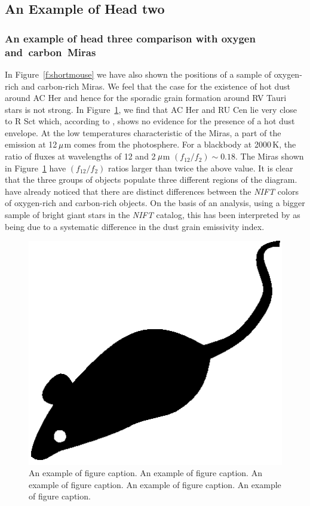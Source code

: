 \documentclass[useAMS,usenatbib]{biom}
\begin{document}
\enlargethispage{-2pt}

\subsection{An Example of Head two}
\subsubsection{An example of head three comparison with oxygen and~carbon~Miras}

In Figure~\ref{f:shortmouse} we have also shown the positions of a
sample of oxygen-rich and carbon-rich Miras.  We feel that the case
for the existence of hot dust around AC Her and hence for the sporadic
grain formation around RV Tauri stars is not strong. In
Figure~\ref{f:bigmouse}, we find that AC Her and RU Cen lie very close
to R Sct which, according to \citet{b9}, shows no evidence for the
presence of a hot dust envelope. At the low temperatures
characteristic of the Miras, a part of the emission at 12$\,\mu$m
comes from the photosphere.  For a blackbody at 2000$\,$K, the ratio
of fluxes at wavelengths of 12 and 2$\,\mu$m $(f_{12}/f_{2})\sim
0.18$. The Miras shown in Figure~\ref{f:bigmouse} have
$(f_{12}/f_{2})$ ratios larger than twice the above value. It is clear
that the three groups of objects populate three different regions of
the diagram. \citet{b10} have already noticed that there are distinct
differences between the {\it NIFT\/} colors of oxygen-rich and
carbon-rich objects. On the basis of an analysis, using a bigger
sample of bright giant stars in the {\it NIFT\/} catalog, this has
been interpreted by \citet{b25} as being due to a systematic
difference in the dust grain emissivity index.

\begin{figure}
  \centerline{\includegraphics[width=4.5in]{mouse.eps}}
  \caption{An example of figure caption. An example of 
  figure caption. An example of figure caption. An example of
   figure caption. An example of figure caption.}
\label{f:bigmouse}
\end{figure}
\end{document}
